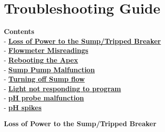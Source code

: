 \documentclass[
]{book}
\begin{document}
\hypertarget{troubleshooting-guide}{%
\chapter{Troubleshooting Guide}\label{troubleshooting-guide}}

\textbf{Contents}\\
- \protect\hyperlink{Tripped_Breaker}{\textbf{Loss of Power to the Sump/Tripped Breaker}}\\
- \protect\hyperlink{Flowmeter_Misreadings}{\textbf{Flowmeter Misreadings}}\\
- \protect\hyperlink{Reboot_Apex}{\textbf{Rebooting the Apex}}\\
- \protect\hyperlink{Sump_Pump_Malfunction}{\textbf{Sump Pump Malfunction}}\\
- \protect\hyperlink{Turn_off_Sump_Flow}{\textbf{Turning off Sump flow}}\\
- \protect\hyperlink{Light_OFF}{\textbf{Light not responding to program}}\\
- \protect\hyperlink{pH_Probe_Malfunction}{\textbf{pH probe malfunction}}\\
- \protect\hyperlink{pH_spikes}{\textbf{pH spikes}}

\textbf{Loss of Power to the Sump/Tripped Breaker}
\end{document}
